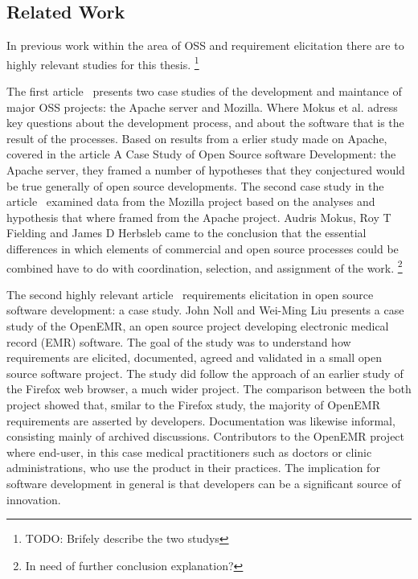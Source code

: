 \documentclass[a4paper,11pt]{article}
\begin{document}
{\subsection{Related Work}
\label{related_work}
In previous work within the area of OSS and requirement elicitation there are to highly relevant studies for this thesis. \footnote{TODO: Brifely describe the two studys}

The first article~\cite{Mockus2002a} presents two case studies of the development and maintance of major OSS projects: the Apache server and Mozilla. Where Mokus et al. adress key questions about the development process, and about the software that is the result of the processes. Based on results from a erlier study made on Apache, covered in the article A Case Study of Open Source software Development: the Apache server, they framed a number of hypotheses that they conjectured would be true generally of open source developments. The second case study in the article~\cite{Mockus2002a} examined data from the Mozilla project based on the analyses and hypothesis that where framed from the Apache project. Audris Mokus, Roy T Fielding and James D Herbsleb came to the conclusion that the essential differences in which elements of commercial and open source processes could be combined have to do with coordination, selection, and assignment of the work. \footnote{In need of further conclusion explanation?}

The second highly relevant article~\cite{Noll} requirements elicitation in open source software development: a case study. John Noll and Wei-Ming Liu presents a case study of the OpenEMR, an open source project developing electronic medical record (EMR) software. The goal of the study was to understand how requirements are elicited, documented, agreed and validated in a small open source software project. The study did follow the approach of an earlier study of the Firefox web browser, a much wider project. The comparison between the both project showed that, smilar to the Firefox study, the majority of OpenEMR requirements are asserted by developers. Documentation was likewise informal, consisting mainly of archived discussions. Contributors to the OpenEMR project where end-user, in this case medical practitioners such as doctors or clinic administrations, who use the product in their practices. The implication for software development in general is that developers can be a significant source of innovation.

}
\end{document}
